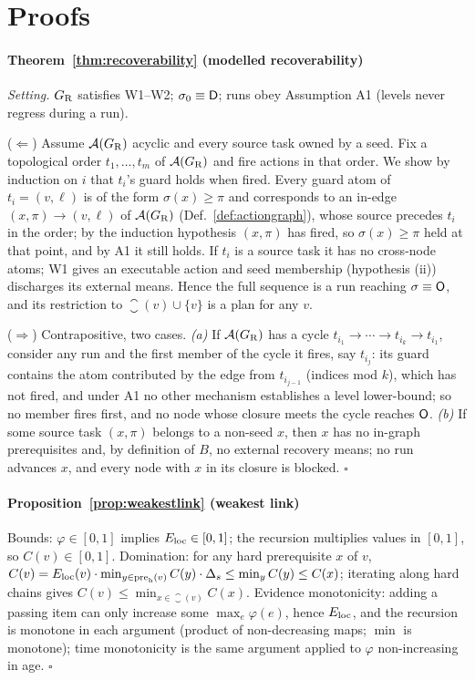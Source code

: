 \section{Proofs}
\label{app:proofs}

\paragraph{Theorem~\ref{thm:recoverability} (modelled recoverability)}
\emph{Setting.} $G_{\mathrm{R}}$ satisfies W1--W2; $\sigma_0 \equiv \mathsf{D}$; runs obey Assumption A1 (levels never regress during a run).

($\Leftarrow$) Assume $\mathcal{A}(G_{\mathrm{R}})$ acyclic and every source task owned by a seed. Fix a topological order $t_1, \ldots, t_m$ of $\mathcal{A}(G_{\mathrm{R}})$ and fire actions in that order. We show by induction on $i$ that $t_i$'s guard holds when fired. Every guard atom of $t_i = (v,\ell)$ is of the form $\sigma(x) \geq \pi$ and corresponds to an in-edge $(x,\pi) \to (v,\ell)$ of $\mathcal{A}(G_{\mathrm{R}})$ (Def.~\ref{def:actiongraph}), whose source precedes $t_i$ in the order; by the induction hypothesis $(x,\pi)$ has fired, so $\sigma(x) \geq \pi$ held at that point, and by A1 it still holds. If $t_i$ is a source task it has no cross-node atoms; W1 gives an executable action and seed membership (hypothesis (ii)) discharges its external means. Hence the full sequence is a run reaching $\sigma \equiv \mathsf{O}$, and its restriction to $\closure(v) \cup \{v\}$ is a plan for any $v$.

($\Rightarrow$) Contrapositive, two cases. \emph{(a)} If $\mathcal{A}(G_{\mathrm{R}})$ has a cycle $t_{i_1} \to \cdots \to t_{i_k} \to t_{i_1}$, consider any run and the first member of the cycle it fires, say $t_{i_j}$: its guard contains the atom contributed by the edge from $t_{i_{j-1}}$ (indices mod $k$), which has not fired, and under A1 no other mechanism establishes a level lower-bound; so no member fires first, and no node whose closure meets the cycle reaches $\mathsf{O}$. \emph{(b)} If some source task $(x, \pi)$ belongs to a non-seed $x$, then $x$ has no in-graph prerequisites and, by definition of $B$, no external recovery means; no run advances $x$, and every node with $x$ in its closure is blocked. \hfill$\square$

\paragraph{Proposition~\ref{prop:weakestlink} (weakest link)}
Bounds: $\varphi \in [0,1]$ implies $E_{\mathrm{loc}} \in [0,1]$; the recursion multiplies values in $[0,1]$, so $C(v) \in [0,1]$. Domination: for any hard prerequisite $x$ of $v$, $C(v) = E_{\mathrm{loc}}(v) \cdot \min_{y \in \mathrm{pre}_{\mathrm{h}}(v)} C(y) \cdot \Delta_s \leq \min_{y} C(y) \leq C(x)$; iterating along hard chains gives $C(v) \leq \min_{x \in \closure(v)} C(x)$. Evidence monotonicity: adding a passing item can only increase some $\max_e \varphi(e)$, hence $E_{\mathrm{loc}}$, and the recursion is monotone in each argument (product of non-decreasing maps; $\min$ is monotone); time monotonicity is the same argument applied to $\varphi$ non-increasing in age. \hfill$\square$

